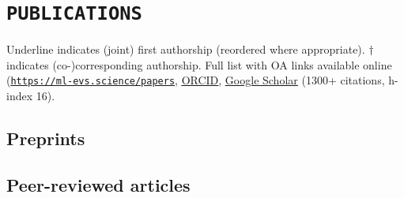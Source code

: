 \documentclass[11pt,a4paper,sans]{moderncv}        %
\newcommand{\colourhref}[2]{\setulcolor{red}\href{#1}{\underline{#2}}}
\begin{document}
\clearpage
\section{\texttt{PUBLICATIONS}}
Underline indicates (joint) first authorship (reordered where appropriate). $\dagger$ indicates (co-)corresponding authorship. Full list with OA links available online (\colourhref{https://ml-evs.science/papers}{\texttt{https://ml-evs.science/papers}}, \colourhref{https://orcid.org/0000-0002-1182-9098}{ORCID}, \colourhref{https://scholar.google.co.uk/citations?user=3aG55qYAAAAJ&hl=en}{Google Scholar} (1300+ citations, h-index 16).
\nocite{*}
\subsection{\hspace{-1in}Preprints}
\printbibliography[heading=none,keyword=inprep]
\vspace{-0.16in}
\subsection{\hspace{-1in}Peer-reviewed articles}
\printbibliography[heading=none, keyword=selected]


\pagestyle{fancy}
\end{document}

